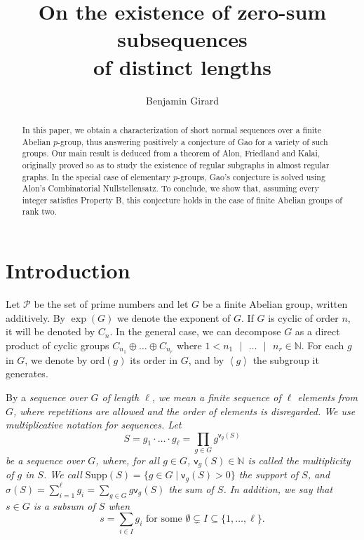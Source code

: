 \documentclass[english,12pt,a4paper,twoside]{smfart}
\title{On the existence of zero-sum subsequences \\ of distinct lengths}
\author{Benjamin Girard}
\theoremstyle{plain}
\theoremstyle{definition}
\theoremstyle{remark}
\begin{document}
\maketitle \setcounter{page}{1} \vspace{0.0cm}

\begin{abstract} 
In this paper, we obtain a characterization of short normal sequences over a finite Abelian $p$-group, thus answering positively a conjecture of Gao for a variety of such groups. 
Our main result is deduced from a theorem of Alon, Friedland and Kalai, originally proved so as to study the existence of regular subgraphs in almost regular graphs. 
In the special case of elementary $p$-groups, Gao's conjecture is solved using Alon's Combinatorial Nullstellensatz. 
To conclude, we show that, assuming every integer satisfies Property B, this conjecture holds in the case of finite Abelian groups of rank two. 
\end{abstract}








\vspace{-0.7cm}
\section{Introduction}
\label{Intro}
Let $\mathcal{P}$ be the set of prime numbers and let $G$ be a finite Abelian group, written additively. By $\exp(G)$ we denote the exponent of $G$. If $G$ is cyclic of order $n$, it will be denoted by $C_n$. In the general case, we can decompose $G$ as a direct product of cyclic groups $C_{n_1} \oplus \dots \oplus C_{n_r}$ where $1 < n_1 \text{ }
|\text{ } \dots \text{ }|\text{ } n_r \in \mathbb{N}$. For each $g$ in $G$, we denote by $\text{ord}(g)$ its order in $G$, and by $\left\langle g\right\rangle$ the subgroup it generates. 

\medskip
By a \em sequence \em over $G$ of \em length \em $\ell$, we mean a finite sequence of $\ell$ elements from $G$, where repetitions are allowed and the order of elements is disregarded. We use multiplicative notation for sequences. Let
$$S = g_1 \cdot \hdots \cdot g_{\ell} = \prod_{g \in G}g^{\mathsf{v}_g(S)}$$
be a sequence over $G$, where, for all $g \in G$, $\mathsf{v}_g(S) \in \mathbb{N}$ is called the \em multiplicity \em of $g$ in $S$. We call $\text{Supp}(S)=\{g \in G \mid \mathsf{v}_g(S)>0\}$ the \em support \em of $S$, and $\sigma(S)=\sum^{\ell}_{i=1}g_i=\sum_{g \in G}g\mathsf{v}_g(S)$ the \em sum \em of $S$. In addition, we say that $s \in G$ is a \em subsum \em of $S$ when
$$s=\displaystyle\sum_{i \in I} g_i \text{ for some }\emptyset \varsubsetneq I \subseteq \{1,\dots,\ell\}.$$
\end{document}
